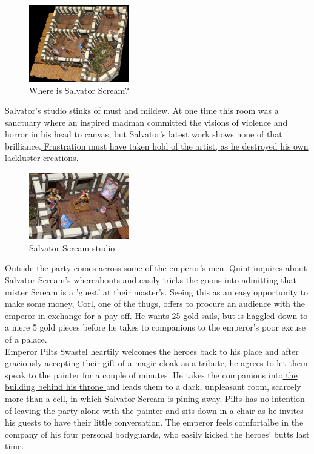 \begin{figure}[h]
	\centering
	\includegraphics[width=0.39\textwidth]{images/Where-is-Salvator-Scream-562539967.jpg}
	\caption{Where is Salvator Scream?}
	\label{fig:Where-is-Salvator-Scream-562539967}
\end{figure}

Salvator's studio stinks of must and mildew. At one time this room was a sanctuary where an inspired madman committed the visions of violence and horror in his head to canvas, but Salvator's latest work shows none of that brilliance.\hyperref[fig:Salvator-Scream-studio-562540993]{ Frustration must have taken hold of the artist, as he destroyed his own lackluster creations. }  \\

\begin{figure}[h]
	\centering
	\includegraphics[width=0.39\textwidth]{images/Salvator-Scream-studio-562540993.jpg}
	\caption{Salvator Scream studio}
	\label{fig:Salvator-Scream-studio-562540993}
\end{figure}

Outside the party comes across some of the emperor's men. Quint inquires about Salvator Scream's whereabouts and easily tricks the goons into admitting that mister Scream is a 'guest' at their master's. Seeing this as an easy opportunity to make some money, Corl, one of the thugs, offers to procure an audience with the emperor in exchange for a pay-off. He wants 25 gold sails, but is haggled down to a mere 5 gold pieces before he takes to companions to the emperor's poor excuse of a palace.\\

Emperor Pilts Swastel heartily welcomes the heroes back to his place and after graciously accepting their gift of a magic cloak as a tribute, he agrees to let them speak to the painter for a couple of minutes. He takes the companions into\hyperref[fig:Pilts-Swastel-emperor-of-Old-Korvosa-562541723]{ the building behind his throne } and leads them to a dark, unpleasant room, scarcely more than a cell, in which Salvator Scream is pining away. Pilts has no intention of leaving the party alone with the painter and sits down in a chair as he invites his guests to have their little conversation. The emperor feels comfortalbe in the company of his four personal bodyguards, who easily kicked the heroes' butts last time. \\

